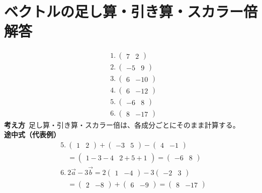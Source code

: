 \documentclass[paper=b4j,landscape,twocolumn,fleqn]{jlreq}
\begin{document}
\newpage
\section{ベクトルの足し算・引き算・スカラー倍 解答}
\begin{align*}
&1.\ \begin{pmatrix}7 & 2\end{pmatrix}\\[0.45em]
&2.\ \begin{pmatrix}-5 & 9\end{pmatrix}\\[0.45em]
&3.\ \begin{pmatrix}6 & -10\end{pmatrix}\\[0.45em]
&4.\ \begin{pmatrix}6 & -12\end{pmatrix}\\[0.45em]
&5.\ \begin{pmatrix}-6 & 8\end{pmatrix}\\[0.45em]
&6.\ \begin{pmatrix}8 & -17\end{pmatrix}
\end{align*}
\textbf{考え方}\
足し算・引き算・スカラー倍は、各成分ごとにそのまま計算する。\\
\textbf{途中式（代表例）}
\begin{align*}
&5.\ \begin{pmatrix}1 & 2\end{pmatrix}+\begin{pmatrix}-3 & 5\end{pmatrix}-\begin{pmatrix}4 & -1\end{pmatrix}\\
&\quad =\begin{pmatrix}1-3-4 & 2+5+1\end{pmatrix}=\begin{pmatrix}-6 & 8\end{pmatrix}\\
&6.\ 2\vec{a}-3\vec{b}=2\begin{pmatrix}1 & -4\end{pmatrix}-3\begin{pmatrix}-2 & 3\end{pmatrix}\\
&\quad =\begin{pmatrix}2 & -8\end{pmatrix}+\begin{pmatrix}6 & -9\end{pmatrix}=\begin{pmatrix}8 & -17\end{pmatrix}
\end{align*}
\end{document}

